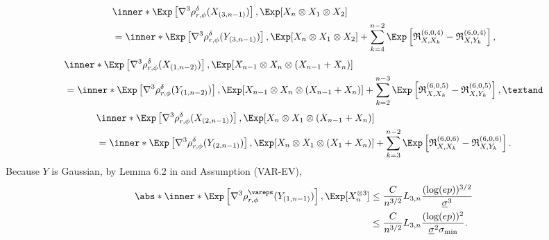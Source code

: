 \documentclass[aos]{imsart}
\begin{document}
\begin{appendix}
\begin{equation*}
\begin{aligned}
    & \inner*{ \Exp\left[ \nabla^3 \rho_{r,\phi}^\delta(X_{(3,n-1)}) \right], \Exp[ X_{n} \otimes X_{1} \otimes X_2 ]} \\
    & = \inner*{ \Exp\left[ \nabla^3 \rho_{r,\phi}^\delta(Y_{(3,n-1)}) \right], \Exp[ X_{n} \otimes X_{1} \otimes X_2 ]}
    + \sum_{k=4}^{n-2} \Exp \left[ 
        \mathfrak{R}_{X,X_k}^{(6,0,4)}
        - \mathfrak{R}_{X,Y_k}^{(6,0,4)}
    \right], \\
\end{aligned}
\end{equation*}
\begin{equation*}
\begin{aligned}
    & \inner*{ \Exp\left[ \nabla^3 \rho_{r,\phi}^\delta(X_{(1,n-2)}) \right], \Exp[ X_{n-1} \otimes X_n \otimes (X_{n-1} + X_n) ]} \\
    & = \inner*{ \Exp\left[ \nabla^3 \rho_{r,\phi}^\delta(Y_{(1,n-2)}) \right], \Exp[ X_{n-1} \otimes X_n \otimes (X_{n-1} + X_n) ]} 
    + \sum_{k=2}^{n-3} \Exp \left[ 
        \mathfrak{R}_{X,X_k}^{(6,0,5)}
        - \mathfrak{R}_{X,Y_k}^{(6,0,5)}
    \right], \textand \\
\end{aligned}
\end{equation*}
\begin{equation*}
\begin{aligned}
    & \inner*{ \Exp\left[ \nabla^3 \rho_{r,\phi}^\delta(X_{(2,n-1)}) \right], \Exp[ X_{n} \otimes X_1 \otimes (X_{n-1} + X_n) ]} \\
    & = \inner*{ \Exp\left[ \nabla^3 \rho_{r,\phi}^\delta(Y_{(2,n-1)}) \right], \Exp[ X_{n} \otimes X_1 \otimes (X_{1} + X_n) ]} 
    + \sum_{k=3}^{n-2} \Exp \left[ 
        \mathfrak{R}_{X,X_k}^{(6,0,6)}
        - \mathfrak{R}_{X,Y_k}^{(6,0,6)}
    \right]. \\
\end{aligned}
\end{equation*}
Because $Y$ is Gaussian, by Lemma 6.2 in  and Assumption (VAR-EV),
\begin{equation*}
\begin{aligned}
    \abs*{ \inner*{ 
        \Exp\left[ \nabla^3 \rho_{r,\phi}^\vareps(Y_{(1,n-1)}) \right], 
        \Exp[X_n^{\otimes 3}] } }
    & \leq \frac{C}{n^{3/2}} L_{3,n} \frac{(\log(ep))^{3/2}}{\underline{\sigma}^3} \\
    & \leq \frac{C}{n^{3/2}} L_{3,n} \frac{(\log(ep))^2}{\underline{\sigma}^2 \sigma_{\min}}.
\end{aligned}

\end{equation*}
\end{appendix}
\end{document}

